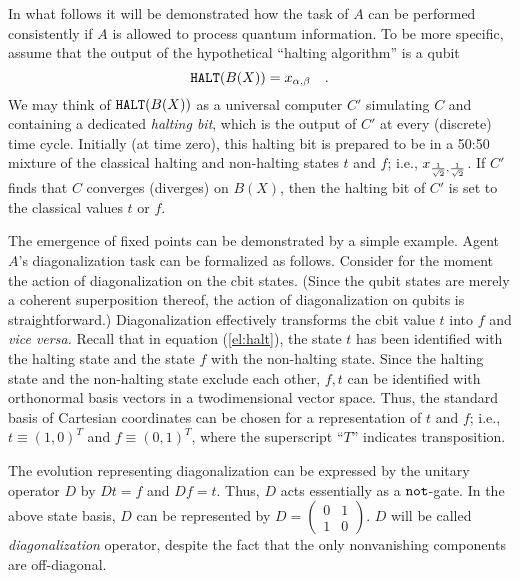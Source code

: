 \documentclass[prl,preprint,showpacs,showkeys,amsfonts,amsmath]{revtex4}
\begin{document}
In what follows it will be demonstrated how the task of $A$
can be performed consistently if
$A$ is allowed to process quantum information.
To be more specific, assume that the output of the hypothetical
``halting algorithm'' is a qubit
\begin{equation}
{\tt HALT} ( B(X) ) = x_{\alpha , \beta}
\quad .
\end{equation}
We may think of   ${\tt HALT} ( B(X) )$ as a universal computer $C'$
simulating $C$ and containing a dedicated {\em halting bit}, which is
the output of $C'$
at every (discrete) time cycle. Initially (at time zero),
this halting bit is prepared to be in a 50:50 mixture of the
classical halting and non-halting states $t$ and $f$; i.e.,
$x_{{1\over \sqrt{2}} , {1\over \sqrt{2}} }$. If $C'$ finds that $C$ converges
(diverges) on $B(X)$, then the halting bit of $C'$ is set to the
classical values $t$ or $f$.


The emergence of fixed points can be demonstrated by a simple example.
Agent $A$'s diagonalization task can be formalized as
follows. Consider for the moment the action of diagonalization  on the
cbit states. (Since the qubit states are merely a coherent superposition
thereof, the action of diagonalization on qubits is straightforward.)
Diagonalization effectively transforms the cbit value $t$ into $f$ and
{\it vice versa.}
Recall that in equation
(\ref{el:halt}),  the state
$t$ has been identified
 with the halting state and the state $f$
with the non-halting
state. Since the halting state and the non-halting state exclude each
other,
$f,t$ can be identified with orthonormal basis vectors  in a
twodimensional vector space. Thus, the standard basis of
Cartesian coordinates can be chosen for a representation of $t$ and $f$;
i.e.,
$
t  \equiv
\left(
1,
0
\right)^T
$ and
$
f \equiv
\left(
0,
1
\right)^T
$, where the superscript ``$T$'' indicates transposition.

The evolution representing diagonalization  can be expressed by the unitary operator $D$ by
$
D t  =  f $ and $
D f  =  t$.
Thus, $D$ acts essentially as a ${\tt not}$-gate.
In the above state basis, $D$ can be represented by
$
D=
\left(
\begin{array}{cc}
0 & 1\\
1 & 0
\end{array}
\right)$.
$ D $ will be called {\em diagonalization} operator, despite the fact
that the only nonvanishing components are off-diagonal.
\end{document}

